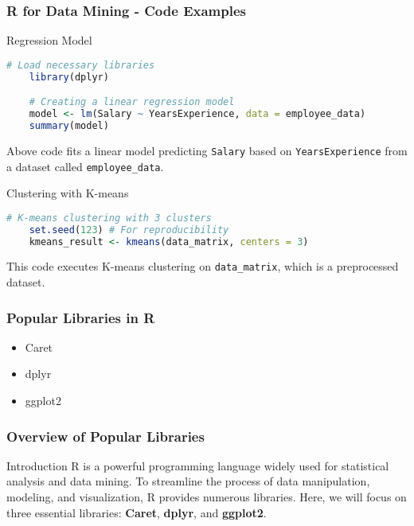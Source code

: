 \documentclass[aspectratio=169]{beamer}
\begin{document}
\begin{frame}[fragile]
  \frametitle{R for Data Mining - Code Examples}
  \begin{block}{Regression Model}
    \begin{lstlisting}[language=R]
    # Load necessary libraries
    library(dplyr)

    # Creating a linear regression model
    model <- lm(Salary ~ YearsExperience, data = employee_data)
    summary(model)
    \end{lstlisting}
    Above code fits a linear model predicting \texttt{Salary} based on \texttt{YearsExperience} from a dataset called \texttt{employee_data}.
  \end{block}

  \begin{block}{Clustering with K-means}
    \begin{lstlisting}[language=R]
    # K-means clustering with 3 clusters
    set.seed(123) # For reproducibility
    kmeans_result <- kmeans(data_matrix, centers = 3)
    \end{lstlisting}
    This code executes K-means clustering on \texttt{data_matrix}, which is a preprocessed dataset.
  \end{block}
\end{frame}

\begin{frame}[fragile]
    \frametitle{Popular Libraries in R}
    \begin{itemize}
        \item Caret
        \item dplyr
        \item ggplot2
    \end{itemize}
\end{frame}

\begin{frame}[fragile]
    \frametitle{Overview of Popular Libraries}
    \begin{block}{Introduction}
        R is a powerful programming language widely used for statistical analysis and data mining. 
        To streamline the process of data manipulation, modeling, and visualization, R provides numerous libraries. 
        Here, we will focus on three essential libraries: 
        \textbf{Caret}, \textbf{dplyr}, and \textbf{ggplot2}.
    \end{block}
\end{frame}
\end{document}
